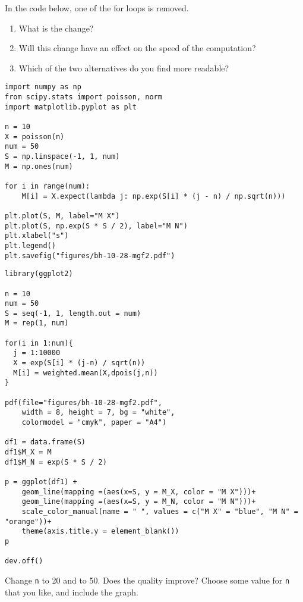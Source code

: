 \begin{exercise}
In the code below, one of the for loops is removed.
\begin{enumerate}
\item What is the change?
\item Will this change have an effect on the speed of the computation?
\item Which of the two alternatives do you find more readable?
\end{enumerate}
\end{exercise}


\begin{verbatim}
import numpy as np
from scipy.stats import poisson, norm
import matplotlib.pyplot as plt

n = 10
X = poisson(n)
num = 50
S = np.linspace(-1, 1, num)
M = np.ones(num)

for i in range(num):
    M[i] = X.expect(lambda j: np.exp(S[i] * (j - n) / np.sqrt(n)))

plt.plot(S, M, label="M X")
plt.plot(S, np.exp(S * S / 2), label="M N")
plt.xlabel("s")
plt.legend()
plt.savefig("figures/bh-10-28-mgf2.pdf")
\end{verbatim}

\begin{verbatim}
library(ggplot2)  

n = 10
num = 50
S = seq(-1, 1, length.out = num)
M = rep(1, num)

for(i in 1:num){
  j = 1:10000
  X = exp(S[i] * (j-n) / sqrt(n))
  M[i] = weighted.mean(X,dpois(j,n))
}

pdf(file="figures/bh-10-28-mgf2.pdf",
    width = 8, height = 7, bg = "white",          
    colormodel = "cmyk", paper = "A4")

df1 = data.frame(S)
df1$M_X = M
df1$M_N = exp(S * S / 2)

p = ggplot(df1) +
    geom_line(mapping =(aes(x=S, y = M_X, color = "M X")))+
    geom_line(mapping =(aes(x=S, y = M_N, color = "M N")))+
    scale_color_manual(name = " ", values = c("M X" = "blue", "M N" = "orange"))+
    theme(axis.title.y = element_blank())
p

dev.off()
\end{verbatim}

\begin{exercise}
Change \texttt{n} to 20 and to 50. Does the quality improve? Choose some value for \texttt{n} that you like, and include the graph.
\end{exercise}


